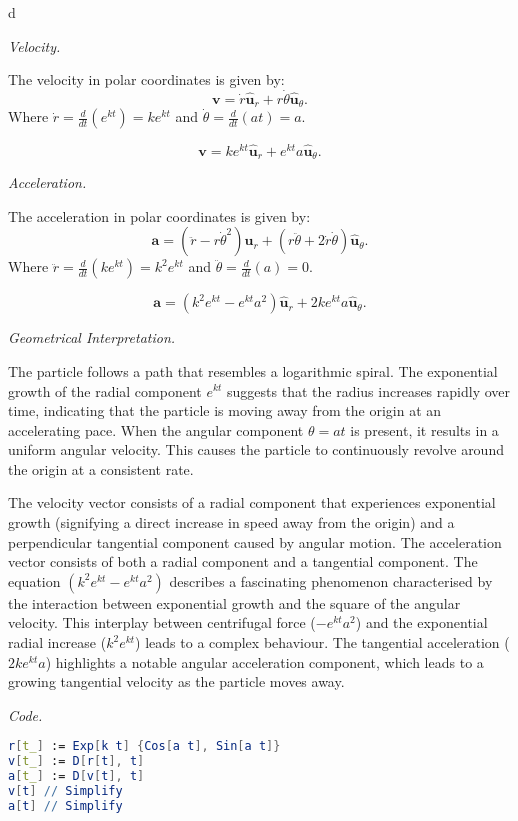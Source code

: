 \begin{solution}{6.4}{d}

    \textit{Velocity.}
    
    The velocity in polar coordinates is given by:
    \[
    \mathbf{v} = \dot{r} \hat{\mathbf{u}}_r + r \dot{\theta} \hat{\mathbf{u}}_\theta .
    \]
    Where \( \dot{r} = \frac{d}{dt} (e^{k t}) = k e^{k t} \) and \( \dot{\theta} = \frac{d}{dt} (a t) = a \).
    
    \[
    \mathbf{v} = k e^{k t} \hat{\mathbf{u}}_r + e^{k t} a \hat{\mathbf{u}}_\theta .\]
    
    \textit{Acceleration.}

    
    The acceleration in polar coordinates is given by:
    \[
    \mathbf{a} = (\ddot{r} - r \dot{\theta}^2) \hat{\mathbf{u}}_r + (r \ddot{\theta} + 2 \dot{r} \dot{\theta}) \hat{\mathbf{u}}_\theta.
    \]
    Where \( \ddot{r} = \frac{d}{dt} (k e^{k t}) = k^2 e^{k t} \) and \( \ddot{\theta} = \frac{d}{dt} (a) = 0 \).
    
    \[
    \mathbf{a} = (k^2 e^{k t} - e^{k t} a^2) \hat{\mathbf{u}}_r + 2 k e^{k t} a \hat{\mathbf{u}}_\theta.
    \]
    

    \textit{Geometrical Interpretation.}


    The particle follows a path that resembles a logarithmic spiral. The exponential growth of the radial component \(e^{kt}\) suggests that the radius increases rapidly over time, indicating that the particle is moving away from the origin at an accelerating pace. When the angular component \(\theta = a t\) is present, it results in a uniform angular velocity. This causes the particle to continuously revolve around the origin at a consistent rate. 

    The velocity vector consists of a radial component that experiences exponential growth (signifying a direct increase in speed away from the origin) and a perpendicular tangential component caused by angular motion. The acceleration vector consists of both a radial component and a tangential component. The equation \((k^2 e^{k t} - e^{k t} a^2)\) describes a fascinating phenomenon characterised by the interaction between exponential growth and the square of the angular velocity. This interplay between centrifugal force (\(-e^{k t} a^2\)) and the exponential radial increase (\(k^2 e^{k t}\)) leads to a complex behaviour. The tangential acceleration (\(2 k e^{k t} a\)) highlights a notable angular acceleration component, which leads to a growing tangential velocity as the particle moves away.

    
    \textit{Code.}
\begin{lstlisting}[language=Mathematica,style=Mathematica,caption={Calculates the Cartesian components of the velocity and acceleration vectors for a particle described by polar coordinates \(r = e^{kt}\) and \(\theta = at\).}]
r[t_] := Exp[k t] {Cos[a t], Sin[a t]}
v[t_] := D[r[t], t]
a[t_] := D[v[t], t]
v[t] // Simplify
a[t] // Simplify
\end{lstlisting}

    

\end{solution}

